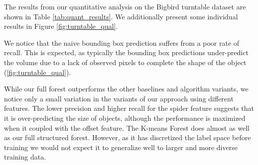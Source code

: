 \documentclass[10pt,twocolumn,letterpaper]{article}
\begin{document}
The results from our quantitative analysis on the Bigbird turntable dataset are shown in Table \ref{tab:quant_results}.
We additionally present some individual results in Figure \ref{fig:turntable_qual}.

We notice that the naive bounding box prediction suffers from a poor rate of recall.
This is expected, as typically the bounding box predictions under-predict the volume due to a lack of observed pixels to complete the shape of the object (\ref{fig:turntable_qual}).

While our full forest outperforms the other baselines and algorithm variants, we notice only a small variation in the variants of our approach using different features.
The lower precision and higher recall for the spider feature suggests that it is over-predicting the size of objects, although the performance is maximized when it coupled with the offset feature.
The K-means Forest does almost as well as our full structured forest.
However, as it has discretized the label space before training we would not expect it to generalize well to larger and more diverse training data.
\end{document}
